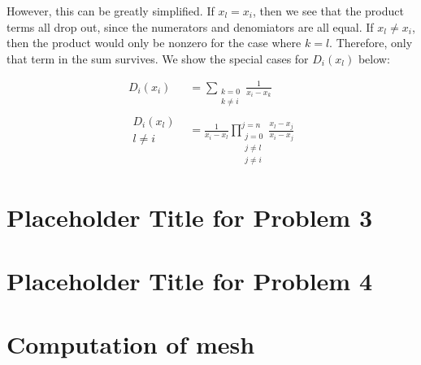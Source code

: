 \documentclass{article}
\begin{document}
However, this can be greatly simplified.
If $x_l = x_i$, then we see that the product terms all drop out,
	since the numerators and denomiators are all equal.
If $x_l \neq x_i$, then the product would only be nonzero for the
	case where $k=l$.
Therefore, only that term in the sum survives.
We show the special cases for $D_i(x_l)$ below:

\begin{align}
D_i(x_i) & = \sum_{\begin{matrix}k=0\\k\neq i\end{matrix}} \frac{1}{x_i - x_k}\\
\begin{matrix}D_i(x_l)\\l \neq i\end{matrix} & = \frac{1}{x_i - x_l} 
	\prod_{
		\begin{matrix} j = 0 \\ j \neq l\\j \neq i \end{matrix}}^{j=n}
		\frac{x_l - x_j}{x_i - x_j} 
\end{align}

\section{Placeholder Title for Problem 3}

\section{Placeholder Title for Problem 4}

\section{Computation of mesh}
\end{document}
